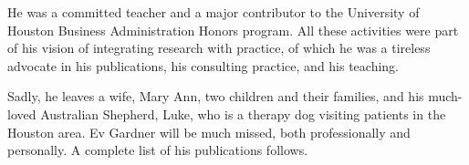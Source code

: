 \documentclass[11pt, a4paper]{article}
\begin{document}
He was a committed teacher and a major contributor to the University of Houston Business Administration Honors program. All these activities were part of his vision of integrating research with practice, of which he was a tireless advocate in his publications, his consulting practice, and his teaching.

Sadly, he leaves a wife, Mary Ann, two children and their families, and his much-loved Australian Shepherd, Luke, who is a therapy dog visiting patients in the Houston area. Ev Gardner will be much missed, both professionally and personally. A complete list of his publications follows.


\nocite{*}
\printbibliography[heading=subbibliography, title = {PhD}, type=thesis]
\printbibliography[heading=subbibliography, title = {Books}, type=book]
\printbibliography[heading=subbibliography, title = {Articles}, filter=other]
\end{document}
